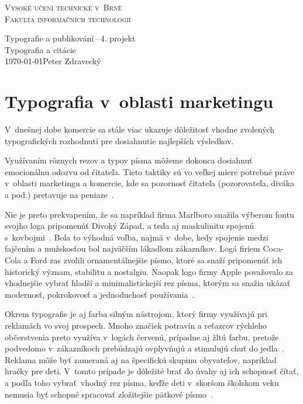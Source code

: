 \documentclass[11pt,a4paper]{article}
\begin{document}
\begin{titlepage}
\begin{center}
    {\Huge{\textsc{Vysoké učení technické v~Brně}}\\}
    {\huge{\textsc{Fakulta informačních technologií}}\\}
    
    {\LARGE{Typografie a publikování\,--\,4. projekt}\\}
    {\Huge{Typografia a citácie}\\}
    {\Large{\today \hfill Peter Zdravecký}}
\end{center}
\end{titlepage}

\section*{Typografia v~oblasti marketingu}

V~dnešnej dobe komercie sa stále viac ukazuje dôležitosť vhodne zvolených typografických rozhodnutí pre dosiahnutie najlepších výsledkov.


Využívaním rôznych rezov a typov písma môžeme dokonca dosiahnuť emocionálnu odozvu od čitateľa.
Tieto taktiky sú vo veľkej miere potrebné práve v~oblasti marketingu a komercie, 
kde sa pozornosť čitateľa (pozorovateľa, diváka a pod.) pretavuje na peniaze~\cite{el-erasmus}. 


Nie je preto prekvapením, že sa napríklad firma Marlboro snažila výberom fontu svojho loga 
pripomenúť Divoký Západ, a teda aj maskulinitu spojenú s~kovbojmi~\cite{thesis-donev}. 
Bola to výhodná voľba, najmä v~dobe, kedy spojenie medzi fajčením a mužskosťou 
bol najväčším lákadlom zákazníkov.
Logá firiem Coca-Cola a Ford zas zvolili ornamentálnejšie písmo, ktoré sa snaží pripomenúť 
ich historický význam, stabilitu a nostalgiu.
Naopak logo firmy Apple považovalo za vhodnejšie vybrať hladší a minimalistickejší rez písma, 
ktorým sa snažia ukázať modernosť, pokrokovosť a jednoduchosť používania~\cite{thesis-ganon}.


Okrem typografie je aj farba silným nástrojom, ktorý firmy využívajú pri reklamách vo svoj prospech.
Mnoho značiek potravín a reťazcov rýchleho občerstvenia preto využíva v~logách červenú, prípadne aj žltú farbu, 
pretože podvedomo v~zákazníkoch prebúdzajú ovplyvňujú a stimulujú chuť do jedla~\cite{el-andel}. 
Reklama môže byť zameraná aj na špecifickú skupinu obyvateľov, napríklad hračky pre deti.
V~tomto prípade je dôležité brať do úvahy aj ich schopnosť čítať, a podľa toho vybrať~vhodný rez písma, keďže deti v~skoršom školskom veku
nemusia byť schopné spracovať zložitejšie pätkové písmo~\cite{serial-cleave-etal}.
\end{document}
